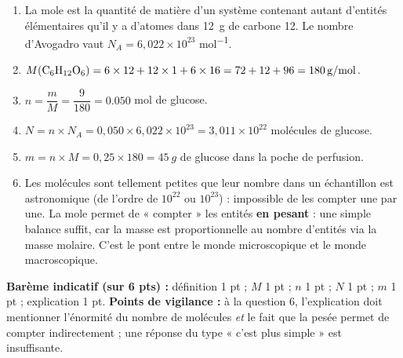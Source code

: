 \documentclass[11pt]{article}
\newcommand{\cle}[1]{{\popxbold\color{popdark}#1}}
\begin{document}
\begin{corrige}
\begin{enumerate}
\item La \cle{mole} est la quantité de matière d'un système contenant autant d'entités élémentaires qu'il y a d'atomes dans \SI{12}{g} de carbone 12. Le nombre d'Avogadro vaut $N_A = 6,022\times 10^{23}$ \unit{mol^{-1}}.
\item $M(\ce{C6H12O6}) = 6\times 12 + 12\times 1 + 6\times 16 = 72 + 12 + 96 = \SI{180}{g/mol}$.
\item $n = \dfrac{m}{M} = \dfrac{9}{180} = \num{0,050}$ mol de glucose.
\item $N = n\times N_A = 0,050\times 6,022\times 10^{23} = 3,011\times 10^{22}$ molécules de glucose.
\item $m = n\times M = 0,25\times 180 = \SI{45}{g}$ de glucose dans la poche de perfusion.
\item Les molécules sont tellement petites que leur nombre dans un échantillon est astronomique (de l'ordre de $10^{22}$ ou $10^{23}$) : impossible de les compter une par une. La mole permet de « compter » les entités \textbf{en pesant} : une simple balance suffit, car la masse est proportionnelle au nombre d'entités via la masse molaire. C'est le pont entre le monde microscopique et le monde macroscopique.
\end{enumerate}
\textbf{Barème indicatif (sur 6 pts) :} définition 1 pt ; $M$ 1 pt ; $n$ 1 pt ; $N$ 1 pt ; $m$ 1 pt ; explication 1 pt.
\textbf{Points de vigilance :} à la question 6, l'explication doit mentionner l'énormité du nombre de molécules \emph{et} le fait que la pesée permet de compter indirectement ; une réponse du type « c'est plus simple » est insuffisante.
\end{corrige}
\end{document}
